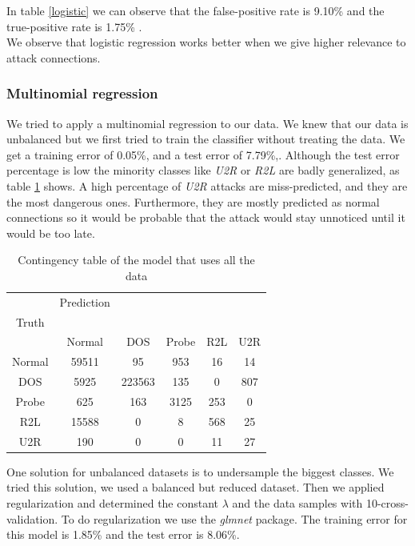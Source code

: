 \documentclass[a4paper]{article} %
\begin{document}
In table \ref{logistic} we can observe that the false-positive rate is 9.10\% and the true-positive rate is 1.75\%  . \\
We observe that logistic regression works better when we give higher relevance to attack connections.

\subsubsection{Multinomial regression}
We tried to apply a multinomial regression to our data. We knew that our data is unbalanced but we first tried to train the classifier without treating the data. We get a training error of 0.05\%, and a test error of 7.79\%,. Although the test error percentage is low the minority classes like \textit{U2R} or \textit{R2L} are badly generalized, as table \ref{table:unbModel} shows. A high percentage of \textit{U2R} attacks are miss-predicted, and they are the most dangerous ones. Furthermore, they are mostly predicted as normal connections so it would be probable that the attack would stay unnoticed until it would be too late. 

\begin{table}[H]
	\centering
	\begin{tabular}{c | c c c c c}
		& Prediction\\
		Truth\\
		 & Normal & DOS & Probe & R2L & U2R \\
		\hline
		Normal	& 59511	& 95 	 & 953	 & 16 	& 14 \\
		DOS		& 5925	& 223563 & 135	 & 0  	& 807\\
		Probe	& 625	& 163	 & 3125	 & 253	& 0 \\
		R2L		& 15588	& 0		 & 8   & 568 	& 25\\
		U2R		& 190	& 0		 & 0    & 11 	& 27\\	
	\end{tabular}
	\caption{Contingency table of the model that uses all the data}
	\label{table:unbModel}
\end{table}


One solution for unbalanced datasets is to undersample the biggest classes. We tried this solution, we used a balanced but reduced dataset. Then we applied regularization and determined the constant $\lambda$ and the data samples with 10-cross-validation. To do regularization we use the \textit{glmnet} package\cite{glmnet}. The training error for this model is 1.85\% and the test error is 8.06\%.
\end{document}
